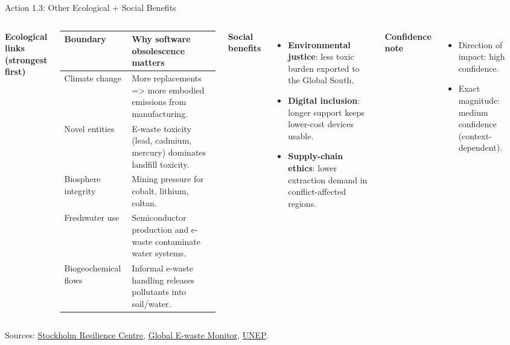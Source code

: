 \documentclass[aspectratio=169]{beamer}
\begin{document}

\begin{frame}{Action 1.3: Other Ecological + Social Benefits}
\scriptsize
\begin{columns}[T,totalwidth=\textwidth]
\textbf{Ecological links (strongest first)}
\begin{tabular}{p{2.4cm}p{4.8cm}}
\toprule
Boundary & Why software obsolescence matters \\
\midrule
Climate change & More replacements => more embodied emissions from manufacturing. \\
Novel entities & E-waste toxicity (lead, cadmium, mercury) dominates landfill toxicity. \\
Biosphere integrity & Mining pressure for cobalt, lithium, coltan. \\
Freshwater use & Semiconductor production and e-waste contaminate water systems. \\
Biogeochemical flows & Informal e-waste handling releases pollutants into soil/water. \\
\bottomrule
\end{tabular}

\textbf{Social benefits}
\begin{itemize}
  \item \textbf{Environmental justice}: less toxic burden exported to the Global South.
  \item \textbf{Digital inclusion}: longer support keeps lower-cost devices usable.
  \item \textbf{Supply-chain ethics}: lower extraction demand in conflict-affected regions.
\end{itemize}

\textbf{Confidence note}
\begin{itemize}
  \item Direction of impact: high confidence.
  \item Exact magnitude: medium confidence (context-dependent).
\end{itemize}
\end{columns}
\vspace{0.08cm}
\tiny Sources: \href{https://www.stockholmresilience.org/research/planetary-boundaries.html}{Stockholm Resilience Centre}, \href{https://ewastemonitor.info/the-global-e-waste-monitor-2024/}{Global E-waste Monitor}, \href{https://www.unep.org}{UNEP}.
\end{frame}
\end{document}
